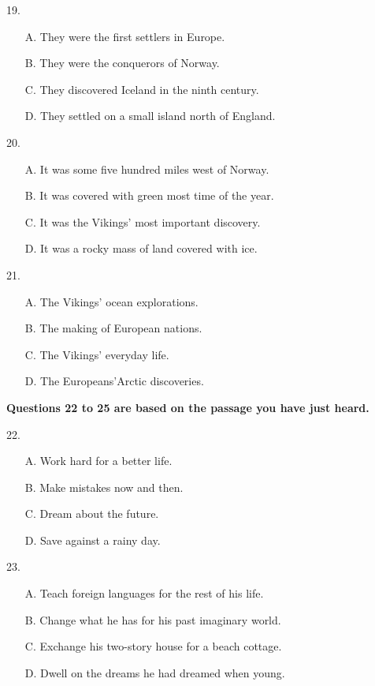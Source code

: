 \documentclass[UTF8,11pt]{ctexart}
\begin{document}
19.


\begin{itemize}[leftmargin=2em,itemsep=.2em,topsep=.4em]\item[A.] They were the first settlers in Europe.
\item[B.] They were the conquerors of Norway.
\item[C.] They discovered Iceland in the ninth century.
\item[D.] They settled on a small island north of England.
\end{itemize}

20.


\begin{itemize}[leftmargin=2em,itemsep=.2em,topsep=.4em]\item[A.] It was some five hundred miles west of Norway.
\item[B.] It was covered with green most time of the year.
\item[C.] It was the Vikings’ most important discovery.
\item[D.] It was a rocky mass of land covered with ice.
\end{itemize}

21.


\begin{itemize}[leftmargin=2em,itemsep=.2em,topsep=.4em]\item[A.] The Vikings’ ocean explorations.
\item[B.] The making of European nations.
\item[C.] The Vikings’ everyday life.
\item[D.] The Europeans’Arctic discoveries.
\end{itemize}

\textbf{Questions 22 to 25 are based on the passage you have just heard.}


22.


\begin{itemize}[leftmargin=2em,itemsep=.2em,topsep=.4em]\item[A.] Work hard for a better life.
\item[B.] Make mistakes now and then.
\item[C.] Dream about the future.
\item[D.] Save against a rainy day.
\end{itemize}

23.


\begin{itemize}[leftmargin=2em,itemsep=.2em,topsep=.4em]\item[A.] Teach foreign languages for the rest of his life.
\item[B.] Change what he has for his past imaginary world.
\item[C.] Exchange his two-story house for a beach cottage.
\item[D.] Dwell on the dreams he had dreamed when young.
\end{itemize}
\end{document}
